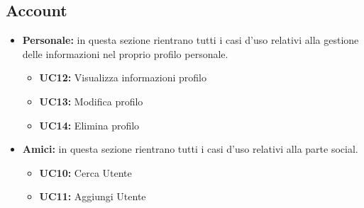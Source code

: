 \subsection{Account}
\begin{itemize}
    \item \textbf{Personale:} in questa sezione rientrano tutti i casi d'uso relativi alla gestione delle informazioni nel proprio profilo personale.
    \begin{itemize}
        \item \textbf{UC12:} Visualizza informazioni profilo 
        \item \textbf{UC13:} Modifica profilo 
        \item \textbf{UC14:} Elimina profilo 
    \end{itemize}
    
    \item \textbf{Amici:} in questa sezione rientrano tutti i casi d'uso relativi alla parte social.
    \begin{itemize}
        \item \textbf{UC10:} Cerca Utente 
        \item \textbf{UC11:} Aggiungi Utente 
    \end{itemize}
\end{itemize}






\newpage

